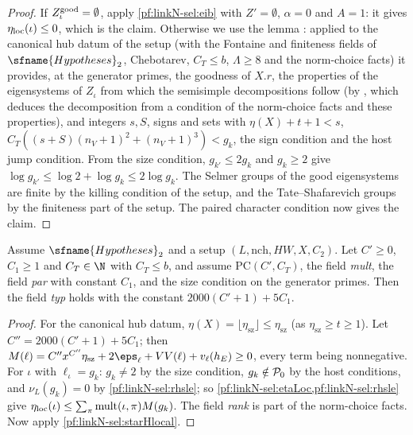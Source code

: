 \begin{proof}
If $Z^{\mathrm{good}}_\iota=\emptyset$, apply \cref{pf:linkN-sel:eib} with $Z'=\emptyset$, $\alpha=0$ and $A=1$: it gives $\eta_{\mathrm{loc}}(\iota)\le0$,
which is the claim. Otherwise we use the lemma : applied to the canonical hub
datum of the setup (with the Fontaine and finiteness fields of $\sfname{Hypotheses}_2$, Chebotarev, $C_T\le b$, $\Lambda\ge8$ and the
norm-choice facts) it provides, at the generator primes, the goodness of $X.r$, the properties of the eigensystems of $Z_\iota$ from which
the semisimple decompositions follow (by , which deduces the decomposition
from a condition of the norm-choice facts and these properties), and integers $s,S$, signs and sets with $\eta(X)+t+1<s$,
$C_T((s+S)(n_V+1)^2+(n_V+1)^3)<g_k$, the sign condition and the host jump condition. From the size condition, $g_{k'}\le2g_k$ and $g_k\ge2$
give $\log g_{k'}\le\log2+\log g_k\le2\log g_k$. The Selmer groups of the good eigensystems are finite by the killing condition of the setup,
and the Tate--Shafarevich groups by the finiteness part of the setup. The paired character condition now gives the claim.
\end{proof}

\begin{proposition}\label{pf:linkN-sel:typprop}
Assume $\sfname{Hypotheses}_2$ and a setup $(L,\mathrm{nch},HW,X,C_2)$. Let $C'\ge0$, $C_1\ge1$ and $C_T\in\N$ with $C_T\le b$, and assume
$\mathrm{PC}(C',C_T)$, the field \emph{mult}, the field \emph{par} with constant $C_1$, and the size condition on the generator primes. Then
the field \emph{typ} holds with the constant $2000(C'+1)+5C_1$.
\end{proposition}

\begin{proof}
For the canonical hub datum, $\eta(X)=\lfloor\eta_{\mathrm{sz}}\rfloor\le\eta_{\mathrm{sz}}$ (as $\eta_{\mathrm{sz}}\ge t\ge1$). Let
$C''=2000(C'+1)+5C_1$; then $M(\ell)=C''x^{C''}\eta_{\mathrm{sz}}+2\eps_\ell+VV(\ell)+v_\ell(h_E)\ge0$, every term being nonnegative. For
$\iota$ with $\ell_\iota=g_k$: $g_k\ne2$ by the size condition, $g_k\notin\mathcal P_0$ by the host conditions, and $\nu_L(g_k)=0$ by
\cref{pf:linkN-sel:rhsle}; so \cref{pf:linkN-sel:etaLoc,pf:linkN-sel:rhsle} give $\eta_{\mathrm{loc}}(\iota)\le\sum_\pi\mathrm{mult}(\iota,\pi)
M(g_k)$. The field \emph{rank} is part of the norm-choice facts. Now apply \cref{pf:linkN-sel:starHlocal}.
\end{proof}

